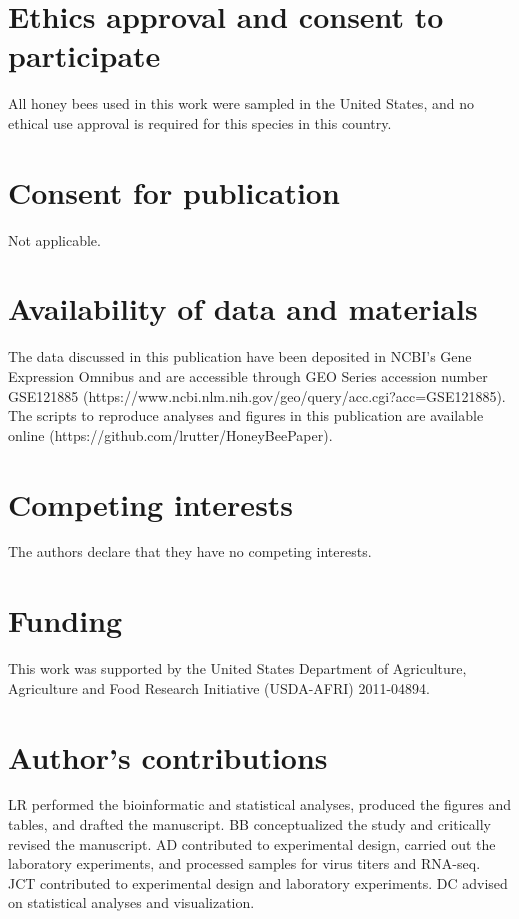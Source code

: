 \documentclass{bmcart}
\begin{document}
\begin{linenumbers}
\begin{doublespacing}
\end{doublespacing} %


\begin{backmatter}

\section*{Ethics approval and consent to participate}
  All honey bees used in this work were sampled in the United States, and no ethical use approval is required for this species in this country.

\section*{Consent for publication}
  Not applicable.

\section*{Availability of data and materials}
  The data discussed in this publication have been deposited in NCBI's Gene Expression Omnibus \cite{geo} and are accessible through GEO Series accession number GSE121885 (https://www.ncbi.nlm.nih.gov/geo/query/acc.cgi?acc=GSE121885). The scripts to reproduce analyses and figures in this publication are available online (https://github.com/lrutter/HoneyBeePaper).

\section*{Competing interests}
  The authors declare that they have no competing interests.

\section*{Funding}
  This work was supported by the United States Department of Agriculture, Agriculture and Food Research Initiative (USDA-AFRI) 2011-04894.

\section*{Author's contributions}
  LR performed the bioinformatic and statistical analyses, produced the figures and tables, and drafted the manuscript. BB conceptualized the study and critically revised the manuscript. AD contributed to experimental design, carried out the laboratory experiments, and processed samples for virus titers and RNA-seq. JCT contributed to experimental design and laboratory experiments. DC advised on statistical analyses and visualization.
    

\end{backmatter}
\end{linenumbers}
\end{document}
